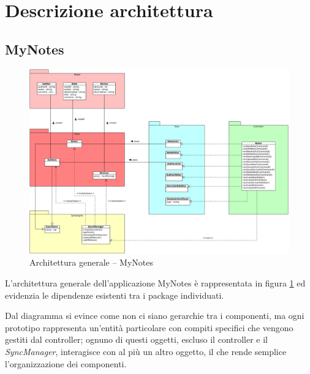 \section{Descrizione architettura}
\subsection{MyNotes}
\begin{figure}[htbp]
\centering
\includegraphics[scale=0.5,angle=90]{gfx/class/MyNotes.pdf}
\caption{Architettura generale -- MyNotes}
\label{fig:architettura MyNotes}
\end{figure}
L'architettura generale dell'applicazione MyNotes è rappresentata in figura \ref{fig:architettura MyNotes} ed evidenzia le dipendenze esistenti tra i package individuati.

Dal diagramma si evince come non ci siano gerarchie tra i componenti, ma ogni prototipo rappresenta un'entità particolare con compiti specifici che vengono gestiti dal controller; ognuno di questi oggetti, escluso il controller e il \emph{SyncManager}, interagisce con al più un altro oggetto, il che rende semplice l'organizzazione dei componenti.

